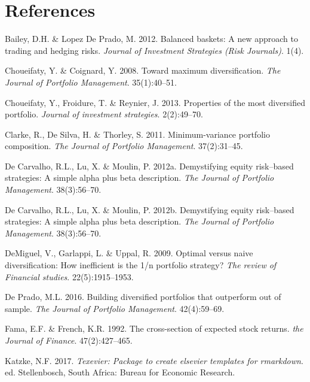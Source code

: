 \documentclass[11pt,preprint, authoryear]{elsarticle}
\numberwithin{equation}{section}
\numberwithin{figure}{section}
\numberwithin{table}{section}
\begin{document}
\newpage

\hypertarget{references}{%
\section*{References}\label{references}}

\hypertarget{refs}{}
\leavevmode\hypertarget{ref-lopez2012}{}%
Bailey, D.H. \& Lopez De Prado, M. 2012. Balanced baskets: A new
approach to trading and hedging risks. \emph{Journal of Investment
Strategies (Risk Journals)}. 1(4).

\leavevmode\hypertarget{ref-choueifaty2008}{}%
Choueifaty, Y. \& Coignard, Y. 2008. Toward maximum diversification.
\emph{The Journal of Portfolio Management}. 35(1):40--51.

\leavevmode\hypertarget{ref-choueifaty2013}{}%
Choueifaty, Y., Froidure, T. \& Reynier, J. 2013. Properties of the most
diversified portfolio. \emph{Journal of investment strategies}.
2(2):49--70.

\leavevmode\hypertarget{ref-clarke2011}{}%
Clarke, R., De Silva, H. \& Thorley, S. 2011. Minimum-variance portfolio
composition. \emph{The Journal of Portfolio Management}. 37(2):31--45.

\leavevmode\hypertarget{ref-rawl2012}{}%
De Carvalho, R.L., Lu, X. \& Moulin, P. 2012a. Demystifying equity
risk--based strategies: A simple alpha plus beta description. \emph{The
Journal of Portfolio Management}. 38(3):56--70.

\leavevmode\hypertarget{ref-leote}{}%
De Carvalho, R.L., Lu, X. \& Moulin, P. 2012b. Demystifying equity
risk--based strategies: A simple alpha plus beta description. \emph{The
Journal of Portfolio Management}. 38(3):56--70.

\leavevmode\hypertarget{ref-demiguel2009}{}%
DeMiguel, V., Garlappi, L. \& Uppal, R. 2009. Optimal versus naive
diversification: How inefficient is the 1/n portfolio strategy?
\emph{The review of Financial studies}. 22(5):1915--1953.

\leavevmode\hypertarget{ref-lopez}{}%
De Prado, M.L. 2016. Building diversified portfolios that outperform out
of sample. \emph{The Journal of Portfolio Management}. 42(4):59--69.

\leavevmode\hypertarget{ref-fama1992}{}%
Fama, E.F. \& French, K.R. 1992. The cross-section of expected stock
returns. \emph{the Journal of Finance}. 47(2):427--465.

\leavevmode\hypertarget{ref-Texevier}{}%
Katzke, N.F. 2017. \emph{Texevier: Package to create elsevier templates
for rmarkdown}. ed. Stellenbosch, South Africa: Bureau for Economic
Research.
\end{document}
